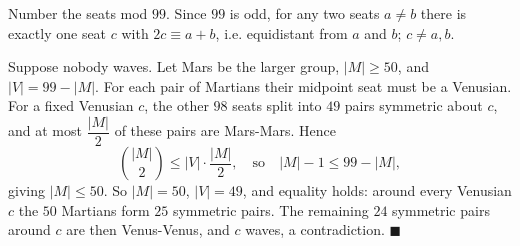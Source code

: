 Number the seats mod $99$. Since $99$ is odd, for any two seats $a\ne b$ there is exactly one seat $c$ with $2c\equiv a+b$, i.e. equidistant from $a$ and $b$; $c\ne a,b$.

Suppose nobody waves. Let Mars be the larger group, $|M|\ge50$, and $|V|=99-|M|$. For each pair of Martians their midpoint seat must be a Venusian. For a fixed Venusian $c$, the other $98$ seats split into $49$ pairs symmetric about $c$, and at most $\dfrac{|M|}2$ of these pairs are Mars-Mars. Hence
\[\binom{|M|}2\le|V|\cdot\dfrac{|M|}2,\quad\text{so}\quad |M|-1\le99-|M|,\]
giving $|M|\le50$. So $|M|=50$, $|V|=49$, and equality holds: around every Venusian $c$ the $50$ Martians form $25$ symmetric pairs. The remaining $24$ symmetric pairs around $c$ are then Venus-Venus, and $c$ waves, a contradiction. $\blacksquare$
